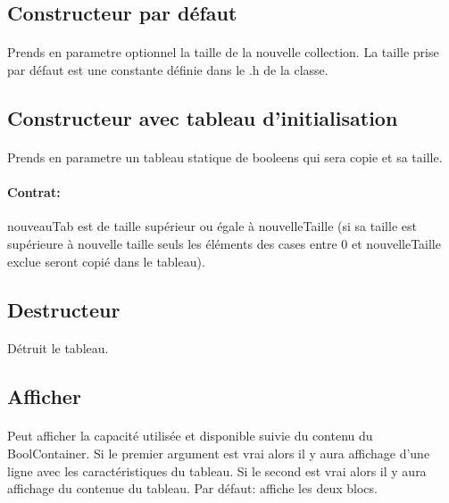 \documentclass[a4paper, 12pts]{article}
\begin{document}
\subsection{Constructeur par défaut}

\paragraph{}
Prends en parametre optionnel la taille de la nouvelle collection. La taille prise par défaut est une constante définie dans le .h de la classe.

\subsection{Constructeur avec tableau d'initialisation}

\paragraph{}
Prends en parametre un tableau statique de booleens qui sera copie et sa taille.
\paragraph{Contrat:}
nouveauTab est de taille supérieur ou égale à nouvelleTaille (si sa taille est supérieure à nouvelle taille seuls les éléments des cases entre 0 et nouvelleTaille exclue seront copié dans le tableau).

\subsection{Destructeur}

\paragraph{}
Détruit le tableau.

\subsection{Afficher}

\paragraph{}
Peut afficher la capacité utilisée et disponible suivie du contenu du BoolContainer. Si le premier argument est vrai alors il y aura affichage d'une ligne avec les caractéristiques du tableau. Si le second est vrai alors il y aura affichage du contenue du tableau. Par défaut: affiche les deux blocs.
\end{document}

